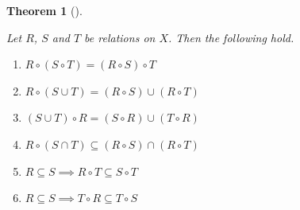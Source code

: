 \documentclass[
  letterpaper,
  10pt,
  reqno,
  twopage,
  openany]{book}
\providecommand{\tightlist}{%
  \setlength{\itemsep}{0pt}\setlength{\parskip}{0pt}}\usepackage{longtable,booktabs,array}
\theoremstyle{plain}
\theoremstyle{definition}
\theoremstyle{definition}
\theoremstyle{definition}
\theoremstyle{plain}
\theoremstyle{plain}
\newtheorem{theorem}{Theorem}[chapter]
\theoremstyle{remark}
\begin{document}
\leavevmode{}%
\begin{theorem}[]\label{thm-relations-composition}

Let \(R\), \(S\) and \(T\) be relations on \(X\). Then the following
hold.

\begin{enumerate}
\def\labelenumi{\arabic{enumi}.}
\tightlist
\item
  \(R\circ (S\circ T)=(R\circ S)\circ T\)
\item
  \(R\circ (S\cup T)=(R\circ S)\cup (R\circ T)\)
\item
  \((S\cup T)\circ R=(S\circ R)\cup (T\circ R)\)
\item
  \(R\circ (S\cap T) \subseteq (R\circ S)\cap (R\circ T)\)
\item
  \(R\subseteq S \implies R\circ T \subseteq S\circ T\)
\item
  \(R\subseteq S \implies T\circ R \subseteq T\circ S\)
\end{enumerate}

\end{theorem}
\end{document}
